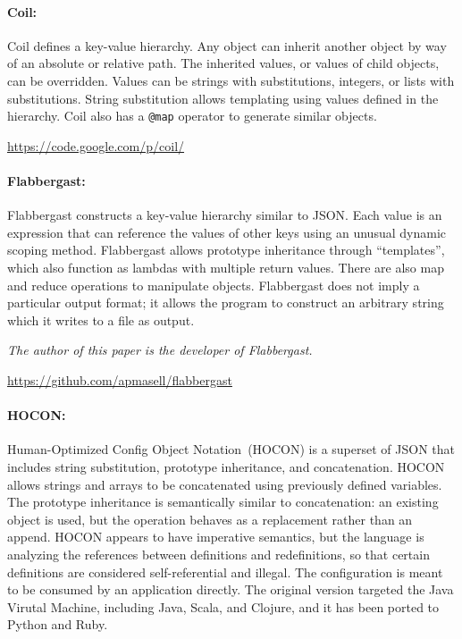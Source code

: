 \documentclass[letterpaper,twocolumn,10pt]{article}
\begin{document}
\paragraph{Coil:}
Coil defines a key-value hierarchy. Any object can inherit another object by way of an absolute or relative path. The inherited values, or values of child objects, can be overridden. Values can be strings with substitutions, integers, or lists with substitutions. String substitution allows templating using values defined in the hierarchy. Coil also has a \texttt{@map} operator to generate similar objects.

\noindent \url{https://code.google.com/p/coil/}

\paragraph{Flabbergast:}
Flabbergast constructs a key-value hierarchy similar to JSON. Each value is an expression that can reference the values of other keys using an unusual dynamic scoping method. Flabbergast allows prototype inheritance through ``templates'', which also function as lambdas with multiple return values. There are also map and reduce operations to manipulate objects. Flabbergast does not imply a particular output format; it allows the program to construct an arbitrary string which it writes to a file as output.

\noindent\emph{The author of this paper is the developer of Flabbergast.}

\noindent \url{https://github.com/apmasell/flabbergast}

\paragraph{HOCON:}
Human-Optimized Config Object Notation~(HOCON) is a superset of JSON that includes string substitution, prototype inheritance, and concatenation. HOCON allows strings and arrays to be concatenated using previously defined variables. The prototype inheritance is semantically similar to concatenation: an existing object is used, but the operation behaves as a replacement rather than an append. HOCON appears to have imperative semantics, but the language is analyzing the references between definitions and redefinitions, so that certain definitions are considered self-referential and illegal. The configuration is meant to be consumed by an application directly. The original version targeted the Java Virutal Machine, including Java, Scala, and Clojure, and it has been ported to Python and Ruby.
\end{document}
